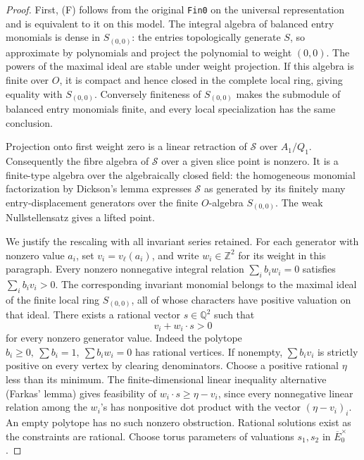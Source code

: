 \begin{proof}
First, (F) follows from the original \texttt{Fin0}
on the universal representation and is equivalent to it
on this model. The integral algebra of balanced
entry monomials is dense in \(S_{(0,0)}\):
the entries topologically generate \(S\), so approximate
by polynomials and project the polynomial to weight
\((0,0)\). The powers of the maximal ideal are stable
under weight projection. If this algebra is finite
over \(O\), it is compact and hence closed in the
complete local ring, giving equality with \(S_{(0,0)}\).
Conversely finiteness of \(S_{(0,0)}\) makes the
submodule of balanced entry monomials finite, and
every local specialization has the same conclusion.

Projection onto first weight zero is a linear
retraction of \(\mathscr S\) over \(A_1/Q_1\).
Consequently the fibre algebra of \(\mathscr S\) over
a given slice point is nonzero. It is a finite-type
algebra over the algebraically closed field:
the homogeneous monomial factorization by Dickson's
lemma expresses \(\mathscr S\) as generated by its
finitely many entry-displacement generators over
the finite \(O\)-algebra \(S_{(0,0)}\).
The weak Nullstellensatz gives a lifted point.

We justify the rescaling with all invariant series retained.
For each generator with nonzero value \(a_i\), set
\(v_i=v_\ell(a_i)\), and write \(w_i\in\mathbb Z^2\)
for its weight in this paragraph. Every nonzero
nonnegative integral relation
\(\sum_i b_i w_i=0\) satisfies
\(\sum_i b_i v_i>0\). The corresponding invariant
monomial belongs to the maximal ideal of the finite
local ring \(S_{(0,0)}\), all of whose characters
have positive valuation on that ideal.
There exists a rational vector \(s\in\mathbb Q^2\)
such that
\[
                         v_i+w_i\cdot s>0
\]
for every nonzero generator value.
Indeed the polytope \(b_i\ge0,\ \sum b_i=1,\
\sum b_iw_i=0\) has rational vertices.
If nonempty, \(\sum b_i v_i\) is strictly positive
on every vertex by clearing denominators.
Choose a positive rational \(\eta\) less than its
minimum. The finite-dimensional linear inequality
alternative (Farkas' lemma) gives feasibility of
\(w_i\cdot s\ge\eta-v_i\), since every nonnegative
linear relation among the \(w_i\)'s has nonpositive
dot product with the vector \((\eta-v_i)_i\).
An empty polytope has no such nonzero obstruction.
Rational solutions exist as the constraints are
rational. Choose torus parameters of valuations
\(s_1,s_2\) in \(\overline E_0^\times\).


\end{proof}
